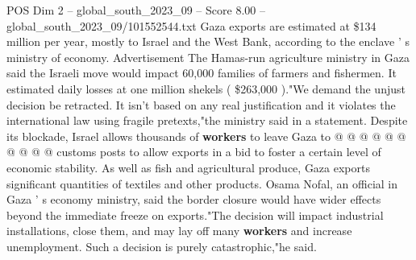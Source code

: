 \begin{textsample}{POS Dim 2 – global\_south\_2023\_09 – Score 8.00 – global\_south\_2023\_09/101552544.txt}
Gaza exports are estimated at \$134 million per year, mostly to Israel and the West Bank, according to the enclave ' s ministry of economy.
Advertisement The Hamas-run agriculture ministry in Gaza said the Israeli move would impact 60,000 families of farmers and fishermen.
It estimated daily losses at one million shekels ( \$263,000 )."We demand the unjust decision be retracted.
It isn't based on any real justification and it violates the international law using fragile pretexts,"the ministry said in a statement.
Despite its blockade, Israel allows thousands of \textbf{workers} to leave Gaza to @ @ @ @ @ @ @ @ @ @ customs posts to allow exports in a bid to foster a certain level of economic stability.
As well as fish and agricultural produce, Gaza exports significant quantities of textiles and other products.
Osama Nofal, an official in Gaza ' s economy ministry, said the border closure would have wider effects beyond the immediate freeze on exports."The decision will impact industrial installations, close them, and may lay off many \textbf{workers} and increase unemployment.
Such a decision is purely catastrophic,"he said.

\end{textsample}
